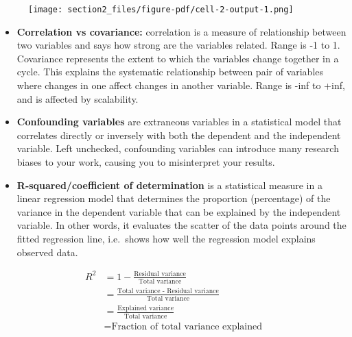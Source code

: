 \documentclass[
  letterpaper,
  DIV=11,
  numbers=noendperiod]{scrreprt}
\providecommand{\tightlist}{%
  \setlength{\itemsep}{0pt}\setlength{\parskip}{0pt}}\usepackage{longtable,booktabs,array}
\begin{document}
\begin{figure}

{\centering \texttt{[image: section2\_files/figure-pdf/cell-2-output-1.png]}

}

\end{figure}

\begin{itemize}
\tightlist
\item
  \textbf{Correlation vs covariance:} correlation is a measure of
  relationship between two variables and says how strong are the
  variables related. Range is -1 to 1. Covariance represents the extent
  to which the variables change together in a cycle. This explains the
  systematic relationship between pair of variables where changes in one
  affect changes in another variable. Range is -inf to +inf, and is
  affected by scalability.
\item
  \textbf{Confounding variables} are extraneous variables in a
  statistical model that correlates directly or inversely with both the
  dependent and the independent variable. Left unchecked, confounding
  variables can introduce many research biases to your work, causing you
  to misinterpret your results.
\item
  \textbf{R-squared/coefficient of determination} is a statistical
  measure in a linear regression model that determines the proportion
  (percentage) of the variance in the dependent variable that can be
  explained by the independent variable. In other words, it evaluates
  the scatter of the data points around the fitted regression line,
  i.e.~shows how well the regression model explains observed data.
\end{itemize}

\[\begin{aligned}
R^{2} &= 1 - \frac{\text{Residual variance}}{\text{Total variance}} \\
&=\frac{\text{Total variance - Residual variance}}{\text{Total variance}} \\
&=\frac{\text{Explained variance}}{\text{Total variance}} \\
&=\text{Fraction of total variance explained}
\end{aligned}\]
\end{document}
